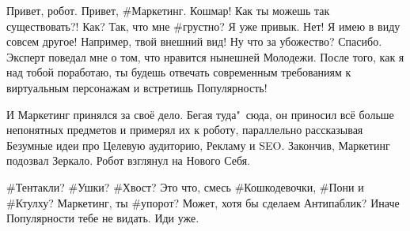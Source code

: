 \begin{dialog}
\X Привет, робот.
\R Привет, \#Маркетинг.
\X Кошмар! Как ты можешь так существовать?!
\R Как? Так, что мне \#грустно? Я уже привык.
\X Нет! Я имею в виду совсем другое! Например, твой внешний вид! Ну что за убожество?
\R Спасибо.
\X Эксперт поведал мне о том, что нравится нынешней Молодежи. После того, как я над тобой поработаю, ты будешь отвечать современным требованиям к виртуальным персонажам и встретишь Популярность! 
\end{dialog}

\begin{monolog}
И Маркетинг принялся за своё дело. Бегая туда"~сюда, он приносил всё больше непонятных предметов и примерял их к роботу, параллельно рассказывая Безумные идеи про Целевую аудиторию, Рекламу и SEO. Закончив, Маркетинг подозвал Зеркало. Робот взглянул на Нового Себя.
\end{monolog}

\begin{dialog}
\R \#Тентакли? \#Ушки? \#Хвост? Это что, смесь \#Кошкодевочки, \#Пони и \#Ктулху? Маркетинг, ты \#упорот?
\X Может, хотя бы сделаем Антипаблик? Иначе Популярности тебе не видать.
\R Иди уже.
\end{dialog}